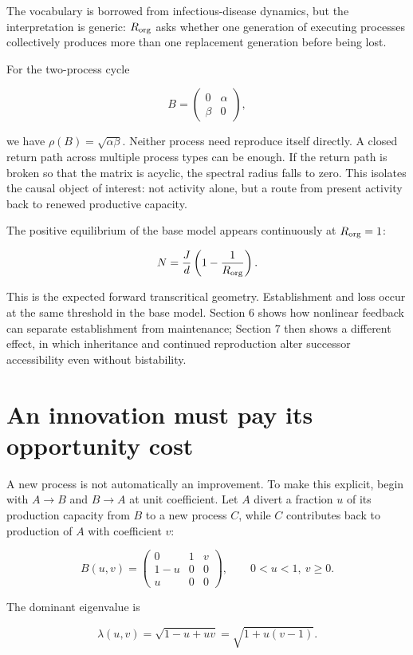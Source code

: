 \documentclass[11pt]{article}
\begin{document}
The vocabulary is borrowed from infectious-disease dynamics, but the
interpretation is generic: \(R_{\rm org}\) asks whether one generation
of executing processes collectively produces more than one replacement
generation before being lost.

For the two-process cycle

\[
B = \begin{pmatrix} 0 & \alpha \\ \beta & 0 \end{pmatrix},
\]

we have \(\rho(B) = \sqrt{\alpha\beta}\). Neither process need reproduce
itself directly. A closed return path across multiple process types can
be enough. If the return path is broken so that the matrix is acyclic,
the spectral radius falls to zero. This isolates the causal object of
interest: not activity alone, but a route from present activity back to
renewed productive capacity.

The positive equilibrium of the base model appears continuously at
\(R_{\rm org} = 1\):

\[
N = \frac{J}{d}\left(1 - \frac{1}{R_{\rm org}}\right).
\]

This is the expected forward transcritical geometry. Establishment and
loss occur at the same threshold in the base model. Section 6 shows how
nonlinear feedback can separate establishment from maintenance; Section
7 then shows a different effect, in which inheritance and continued
reproduction alter successor accessibility even without bistability.

\section{An innovation must pay its opportunity
cost}
A new process is not automatically an improvement. To make this
explicit, begin with \(A \to B\) and \(B \to A\) at unit coefficient.
Let \(A\) divert a fraction \(u\) of its production capacity from \(B\)
to a new process \(C\), while \(C\) contributes back to production of
\(A\) with coefficient \(v\):

\[
B(u,v) = \begin{pmatrix} 0 & 1 & v \\ 1-u & 0 & 0 \\ u & 0 & 0 \end{pmatrix}, \qquad 0 < u < 1,\ v \geq 0.
\]

The dominant eigenvalue is

\[
\lambda(u,v) = \sqrt{1-u+uv} = \sqrt{1+u(v-1)}.
\]
\end{document}
